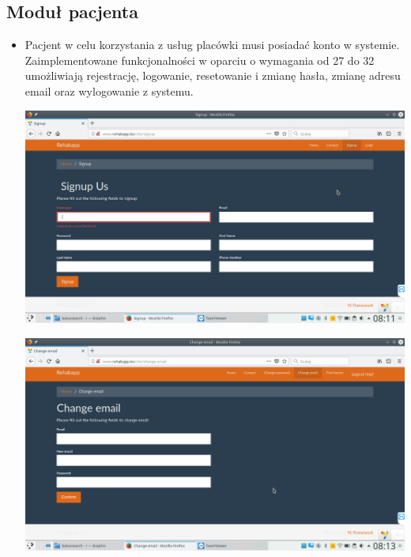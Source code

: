 \subsection{Moduł pacjenta}



\begin{itemize}
	\item Pacjent w celu korzystania z usług placówki musi posiadać konto w systemie. Zaimplementowane funkcjonalności w oparciu o wymagania od 27 do 32 umożliwiają rejestrację, logowanie, resetowanie i zmianę hasła, zmianę adresu email oraz wylogowanie z systemu.

\vspace{0,5cm}
\includegraphics[scale=0.4]{obraz/17.png}
\vspace{0,5cm}

\vspace{0,5cm}
\includegraphics[scale=0.4]{obraz/19.png}
\vspace{0,5cm}


\end{itemize}
